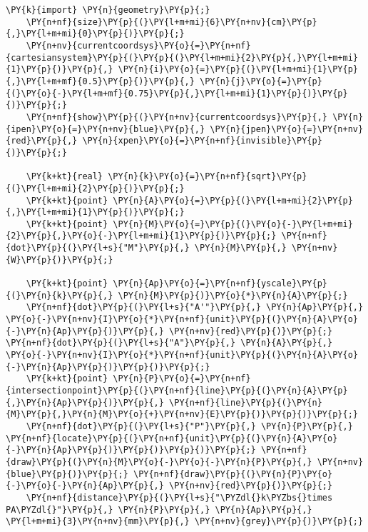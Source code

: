 \begin{Verbatim}[commandchars=\\\{\}]
    \PY{k}{import} \PY{n}{geometry}\PY{p}{;}
    \PY{n+nf}{size}\PY{p}{(}\PY{l+m+mi}{6}\PY{n+nv}{cm}\PY{p}{,}\PY{l+m+mi}{0}\PY{p}{)}\PY{p}{;}
    \PY{n+nv}{currentcoordsys}\PY{o}{=}\PY{n+nf}{cartesiansystem}\PY{p}{(}\PY{p}{(}\PY{l+m+mi}{2}\PY{p}{,}\PY{l+m+mi}{1}\PY{p}{)}\PY{p}{,} \PY{n}{i}\PY{o}{=}\PY{p}{(}\PY{l+m+mi}{1}\PY{p}{,}\PY{l+m+mf}{0.5}\PY{p}{)}\PY{p}{,} \PY{n}{j}\PY{o}{=}\PY{p}{(}\PY{o}{-}\PY{l+m+mf}{0.75}\PY{p}{,}\PY{l+m+mi}{1}\PY{p}{)}\PY{p}{)}\PY{p}{;}
    \PY{n+nf}{show}\PY{p}{(}\PY{n+nv}{currentcoordsys}\PY{p}{,} \PY{n}{ipen}\PY{o}{=}\PY{n+nv}{blue}\PY{p}{,} \PY{n}{jpen}\PY{o}{=}\PY{n+nv}{red}\PY{p}{,} \PY{n}{xpen}\PY{o}{=}\PY{n+nf}{invisible}\PY{p}{)}\PY{p}{;}

    \PY{k+kt}{real} \PY{n}{k}\PY{o}{=}\PY{n+nf}{sqrt}\PY{p}{(}\PY{l+m+mi}{2}\PY{p}{)}\PY{p}{;}
    \PY{k+kt}{point} \PY{n}{A}\PY{o}{=}\PY{p}{(}\PY{l+m+mi}{2}\PY{p}{,}\PY{l+m+mi}{1}\PY{p}{)}\PY{p}{;}
    \PY{k+kt}{point} \PY{n}{M}\PY{o}{=}\PY{p}{(}\PY{o}{-}\PY{l+m+mi}{2}\PY{p}{,}\PY{o}{-}\PY{l+m+mi}{1}\PY{p}{)}\PY{p}{;} \PY{n+nf}{dot}\PY{p}{(}\PY{l+s}{"M"}\PY{p}{,} \PY{n}{M}\PY{p}{,} \PY{n+nv}{W}\PY{p}{)}\PY{p}{;}

    \PY{k+kt}{point} \PY{n}{Ap}\PY{o}{=}\PY{n+nf}{yscale}\PY{p}{(}\PY{n}{k}\PY{p}{,} \PY{n}{M}\PY{p}{)}\PY{o}{*}\PY{n}{A}\PY{p}{;}
    \PY{n+nf}{dot}\PY{p}{(}\PY{l+s}{"A'"}\PY{p}{,} \PY{n}{Ap}\PY{p}{,} \PY{o}{-}\PY{n+nv}{I}\PY{o}{*}\PY{n+nf}{unit}\PY{p}{(}\PY{n}{A}\PY{o}{-}\PY{n}{Ap}\PY{p}{)}\PY{p}{,} \PY{n+nv}{red}\PY{p}{)}\PY{p}{;} \PY{n+nf}{dot}\PY{p}{(}\PY{l+s}{"A"}\PY{p}{,} \PY{n}{A}\PY{p}{,} \PY{o}{-}\PY{n+nv}{I}\PY{o}{*}\PY{n+nf}{unit}\PY{p}{(}\PY{n}{A}\PY{o}{-}\PY{n}{Ap}\PY{p}{)}\PY{p}{)}\PY{p}{;}
    \PY{k+kt}{point} \PY{n}{P}\PY{o}{=}\PY{n+nf}{intersectionpoint}\PY{p}{(}\PY{n+nf}{line}\PY{p}{(}\PY{n}{A}\PY{p}{,}\PY{n}{Ap}\PY{p}{)}\PY{p}{,} \PY{n+nf}{line}\PY{p}{(}\PY{n}{M}\PY{p}{,}\PY{n}{M}\PY{o}{+}\PY{n+nv}{E}\PY{p}{)}\PY{p}{)}\PY{p}{;}
    \PY{n+nf}{dot}\PY{p}{(}\PY{l+s}{"P"}\PY{p}{,} \PY{n}{P}\PY{p}{,} \PY{n+nf}{locate}\PY{p}{(}\PY{n+nf}{unit}\PY{p}{(}\PY{n}{A}\PY{o}{-}\PY{n}{Ap}\PY{p}{)}\PY{p}{)}\PY{p}{)}\PY{p}{;} \PY{n+nf}{draw}\PY{p}{(}\PY{n}{M}\PY{o}{-}\PY{o}{-}\PY{n}{P}\PY{p}{,} \PY{n+nv}{blue}\PY{p}{)}\PY{p}{;} \PY{n+nf}{draw}\PY{p}{(}\PY{n}{P}\PY{o}{-}\PY{o}{-}\PY{n}{Ap}\PY{p}{,} \PY{n+nv}{red}\PY{p}{)}\PY{p}{;}
    \PY{n+nf}{distance}\PY{p}{(}\PY{l+s}{"\PYZdl{}k\PYZbs{}times PA\PYZdl{}"}\PY{p}{,} \PY{n}{P}\PY{p}{,} \PY{n}{Ap}\PY{p}{,} \PY{l+m+mi}{3}\PY{n+nv}{mm}\PY{p}{,} \PY{n+nv}{grey}\PY{p}{)}\PY{p}{;}
\end{Verbatim}
